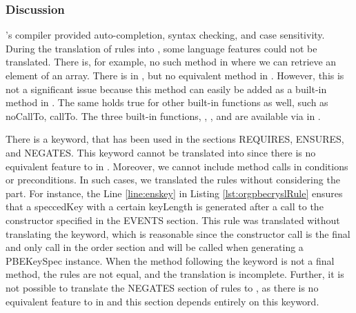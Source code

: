\subsubsection*{Discussion}
\crysl{}'s compiler provided auto-completion, syntax checking, and case sensitivity. During the translation of \crysl{} rules into \MARK{}, some language features could not be translated. There is, for example, no such method in \MARK{} where we can retrieve an element of an array. There is  in \crysl, but no equivalent method in \MARK. However, this is not a significant issue because this method can easily be added as a built-in method in \MARK. The same holds true for other built-in functions as well, such as noCallTo, callTo. The three built-in functions, , , and  are available via  in \MARK.

There is a keyword,  that has been used in the sections REQUIRES, ENSURES, and NEGATES. This keyword cannot be translated into \MARK{} since there is no equivalent feature to  in \MARK. Moreover, we cannot include method calls in conditions or preconditions. In such cases, we translated the rules without considering the  part. For instance, the Line \ref{line:enskey} in Listing \ref{lst:orgpbecryslRule} ensures that a speccedKey with a certain keyLength is generated after a call to the constructor specified in the EVENTS section. This rule was translated without translating the  keyword, which is reasonable since the constructor call is the final and only call in the order section and will be called when generating a PBEKeySpec instance. When the method following the keyword  is not a final method, the rules are not equal, and the \MARK{} translation is incomplete. Further, it is not possible to translate the NEGATES section of \crysl{} rules to \MARK, as there is no equivalent feature to  in \MARK{} and this section depends entirely on this keyword.
